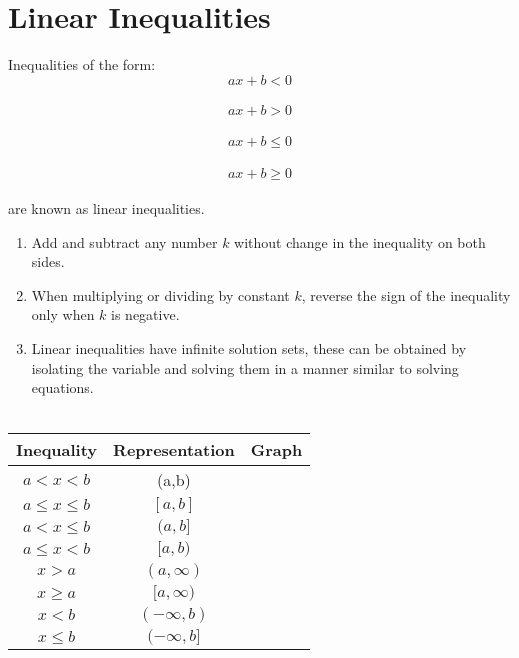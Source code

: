 \section{Linear Inequalities}

\begin{spacing}{0.5}

Inequalities of the form: \\
\[ax + b < 0\] \\
\[ax + b > 0\] \\
\[ax + b \leq 0\] \\
\[ax + b \geq 0\] \\
are known as linear inequalities.

\begin{enumerate}
\item Add and subtract any number $k$ without change in the inequality on both sides.
\item When multiplying or dividing by constant $k$, reverse the sign of the inequality only when $k$ is negative.
\item Linear inequalities have infinite solution sets, these can be obtained by isolating the variable and solving them in a manner similar to solving equations.\\ \\
\end{enumerate}
\end{spacing}

\centering
\begin{tabular}{|c|c|>{\centering\arraybackslash}p{}|}
\hline 
Inequality & Representation & Graph \\ 
\hline 
$ a < x < b$ & (a,b) &  \\ 
\hline 
$ a \leq x \leq b $ & $ [a,b] $ &  \\ 
\hline 
$ a < x \leq b $ & $ (a,b] $ &  \\ 
\hline 
$ a \leq x < b $ & $ [a,b) $ &  \\ 
\hline 
$ x > a $ & $ (a,\infty) $ &  \\ 
\hline 
$ x \geq a $ & $ [a,\infty) $ &  \\ 
\hline 
$ x < b $ & $ (-\infty,b) $ &  \\ 
\hline 
$ x \leq b $ & $ (-\infty,b] $ &  \\ 
\hline 
\end{tabular} 